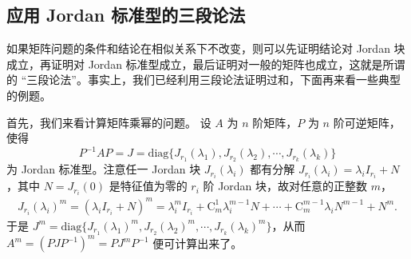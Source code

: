 \documentclass[../../main.tex]{subfiles}%
\begin{document}
\subsection{应用 Jordan 标准型的三段论法}
 
如果矩阵问题的条件和结论在相似关系下不改变，则可以先证明结论对 Jordan 块成立，再证明对 Jordan 标准型成立，最后证明对一般的矩阵也成立，这就是所谓的 “三段论法”。事实上，我们已经利用三段论法证明过和，下面再来看一些典型的例题。

首先，我们来看计算矩阵乘幂的问题。
设 $A$ 为 $n$ 阶矩阵，$P$ 为 $n$ 阶可逆矩阵，使得 
\[
P^{-1}AP = J = \mathrm{diag}\{J_{r_1}(\lambda_1), J_{r_2}(\lambda_2), \cdots, J_{r_k}(\lambda_k)\}
\] 
为 Jordan 标准型。注意任一 Jordan 块 $J_{r_i}(\lambda_i)$ 都有分解 $J_{r_i}(\lambda_i) = \lambda_i I_{r_i} + N$，其中 $N = J_{r_i}(0)$ 是特征值为零的 $r_i$ 阶 Jordan 块，故对任意的正整数 $m$，
\begin{align*}
J_{r_i}(\lambda_i)^m = (\lambda_i I_{r_i} + N)^m = \lambda_i^m I_{r_i} + \mathrm{C}_m^1 \lambda_i^{m - 1} N + \cdots + \mathrm{C}_m^{m - 1} \lambda_i N^{m - 1} + N^m.
\end{align*}
于是 $J^m = \mathrm{diag}\{J_{r_1}(\lambda_1)^m, J_{r_2}(\lambda_2)^m, \cdots, J_{r_k}(\lambda_k)^m\}$，从而 $A^m = (PJP^{-1})^m = PJ^mP^{-1}$ 便可计算出来了。 
\end{document}
